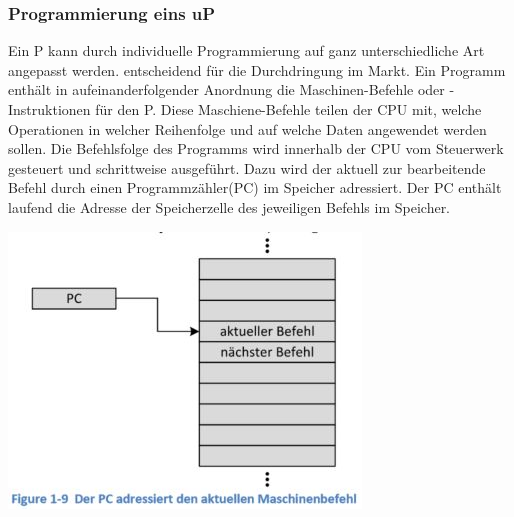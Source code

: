\subsubsection{Programmierung eins uP}
\begin{multicols}{2}
\begin{minipage}{\linewidth}
    Ein \mu P kann durch individuelle Programmierung auf ganz unterschiedliche Art angepasst werden. \newline
    \rightarrow entscheidend für die Durchdringung im Markt.\newline
    Ein Programm enthält in aufeinanderfolgender Anordnung die Maschinen-Befehle oder -Instruktionen für den \mu P. Diese Maschiene-Befehle teilen der CPU mit, welche Operationen in welcher Reihenfolge und auf welche Daten angewendet werden sollen. \newline
    Die Befehlsfolge des Programms wird innerhalb der CPU vom Steuerwerk gesteuert und schrittweise ausgeführt. Dazu wird der aktuell zur bearbeitende Befehl durch einen Programmzähler(PC) im Speicher adressiert.\newline
    Der PC enthält laufend die Adresse der Speicherzelle des jeweiligen Befehls im Speicher.
\end{minipage}

\includegraphics[width=\linewidth]{images/uPPC}
\end{multicols}
    
